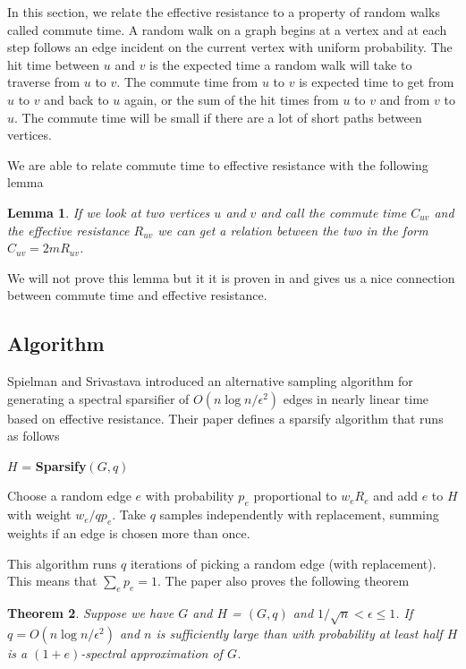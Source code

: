 \documentclass[12pt,twoside]{article}
\newtheorem{thm}{Theorem}
\newtheorem{lemma}[thm]{Lemma}
\newenvironment{centered}[0]{%
  \begin{list}{}{%
    \setlength{\topsep}{0pt}%
    \setlength{\leftmargin}{.25in}%
    \setlength{\rightmargin}{.25in}%
    \setlength{\listparindent}{\parindent}%
    \setlength{\itemindent}{\parindent}%
    \setlength{\parsep}{\parskip}%
  }
  \item[]}{\end{list}}
\begin{document}
In this section, we relate the effective resistance to a property of random walks called commute time. A random walk on a graph begins at a vertex and at each step follows an edge incident on the current vertex with uniform probability. The hit time between $u$ and $v$ is the expected time a random walk will take to traverse from $u$ to $v$. The commute time from $u$ to $v$ is expected time to get from $u$ to $v$ and back to $u$ again, or the sum of the hit times from $u$ to $v$ and from $v$ to $u$. The commute time will be small if there are a lot of short paths between vertices. 

We are able to relate commute time to effective resistance with the following lemma

\begin{lemma}
\label{lem:commute-time-effective-resist}
If we look at two vertices $u$ and $v$ and call the commute time $C_{uv}$ and the effective resistance $R_{uv}$ we can get a relation between the two in the form $C_{uv} = 2m R_{uv}$.
\end{lemma}

We will not prove this lemma but it it is proven in \cite{wisc-effective-resistance} and gives us a nice connection between commute time and effective resistance.

\subsection{Algorithm}

Spielman and Srivastava introduced an alternative sampling algorithm for generating a spectral sparsifier of $O(n\log n/\epsilon^2)$ edges in nearly linear time based on effective resistance. Their paper \cite{spielman-effective-resistance} defines a sparsify algorithm that runs as follows

\begin{centered}
$H$ = \textbf{Sparsify}$(G,q)$

Choose a random edge $e$ with probability $p_e$ proportional to $w_e R_e$ and add $e$ to $H$ with weight $w_e/qp_e$. Take $q$ samples independently with replacement, summing weights if an edge is chosen more than once. 
\end{centered}

This algorithm runs $q$ iterations of picking a random edge (with replacement). This means that $\sum_e p_e = 1$. The paper also proves the following theorem

\begin{thm}
Suppose we have $G$ and $H$ = $(G, q)$ and $1/\sqrt{n} < \epsilon \leq 1$. If $q=O(n\log n /\epsilon^2)$ and $n$ is sufficiently large than with probability at least half $H$ is a $(1+e)$-spectral approximation of $G$.
\end{thm}
\end{document}
